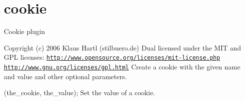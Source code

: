 \hypertarget{cookie-example}{}\section{cookie}
Cookie plugin

Copyright (c) 2006 Klaus Hartl (stilbuero.\+de) Dual licensed under the M\+IT and G\+PL licenses\+: \href{http://www.opensource.org/licenses/mit-license.php}{\tt http\+://www.\+opensource.\+org/licenses/mit-\/license.\+php} \href{http://www.gnu.org/licenses/gpl.html}{\tt http\+://www.\+gnu.\+org/licenses/gpl.\+html} Create a cookie with the given name and value and other optional parameters.

(\textquotesingle{}the\+\_\+cookie\textquotesingle{}, \textquotesingle{}the\+\_\+value\textquotesingle{});  Set the value of a cookie.


\begin{DoxyCodeInclude}
\end{DoxyCodeInclude}
 
